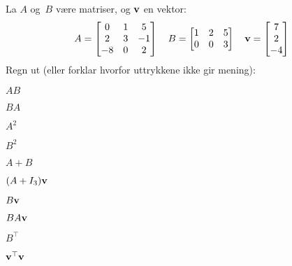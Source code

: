 
\begin{oppgave}
La $A$ og~$B$ være matriser, og $\mathbf{v}$ en vektor:
\[
A =
\begin{bmatrix}
 0 & 1 &  5 \\
 2 & 3 & -1 \\
-8 & 0 & 2
\end{bmatrix}
\quad
B =
\begin{bmatrix}
1 & 2 & 5 \\
0 & 0 & 3
\end{bmatrix}
\quad
\mathbf{v} = \begin{bmatrix} 7 \\ 2 \\ -4 \end{bmatrix}
\]
Regn ut (eller forklar hvorfor uttrykkene ikke gir mening):
\begin{punkt}
$AB$
\end{punkt}
\begin{punkt}
$BA$
\end{punkt}
\begin{punkt}
$A^2$
\end{punkt}
\begin{punkt}
$B^2$
\end{punkt}
\begin{punkt}
$A+B$
\end{punkt}
\begin{punkt}
$(A + I_3) \mathbf{v}$
\end{punkt}
\begin{punkt}
$B\mathbf{v}$
\end{punkt}
\begin{punkt}
$BA\mathbf{v}$
\end{punkt}
\begin{punkt}
$B^\top$
\end{punkt}
\begin{punkt}
$\mathbf{v}^\top \mathbf{v}$
\end{punkt}
\end{oppgave}

